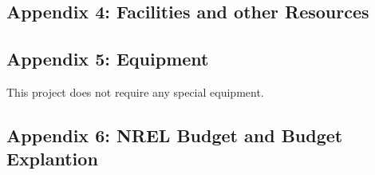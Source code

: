 \documentclass[11pt]{article}
\begin{document}
 
\newpage
\subsection*{Appendix 4:  Facilities and other Resources}


\newpage
\subsection*{Appendix 5:  Equipment}

This project does not require any special equipment.

\newpage
\subsection*{Appendix 6:  NREL Budget and Budget Explantion}

\end{document}
